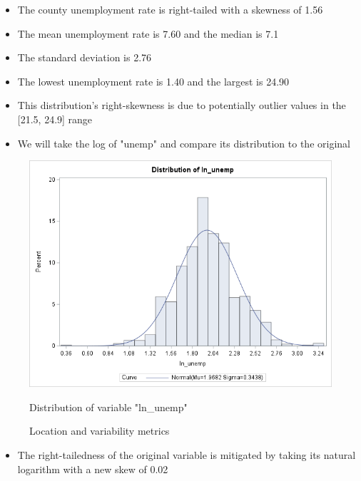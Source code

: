 \documentclass[12pt]{article}
\begin{document}
\begin{itemize}
    \item The county unemployment rate is right-tailed with a skewness of 1.56
    \item The mean unemployment rate is 7.60 and the median is 7.1
    \item The standard deviation is 2.76
    \item The lowest unemployment rate is 1.40 and the largest is 24.90
    \item This distribution's right-skewness is due to potentially outlier values in the [21.5, 24.9] range
    \item We will take the log of "unemp" and compare its distribution to the original
\end{itemize}
\newpage
\begin{figure}[h]
    \centering
    \begin{minipage}[t]{0.65\textwidth}
        \vspace{0pt}
        \centering
        \includegraphics[width=\textwidth]{images/ln_unemp_hist.png}
        \caption{Distribution of variable "ln\_unemp"}
        \label{fig:ln_unemp_dist}
    \end{minipage}\hfill
    \begin{minipage}[t]{0.3\textwidth}
        \vspace{15pt}
        \centering
        
        \caption{Location and variability metrics}
        \label{fig:ln_unemp_measures}
    \end{minipage}
    \label{fig:ln_unemp_fig}
\end{figure}
\begin{itemize}
    \item The right-tailedness of the original variable is mitigated by taking its natural logarithm with a new skew of 0.02
\end{itemize}
\end{document}
